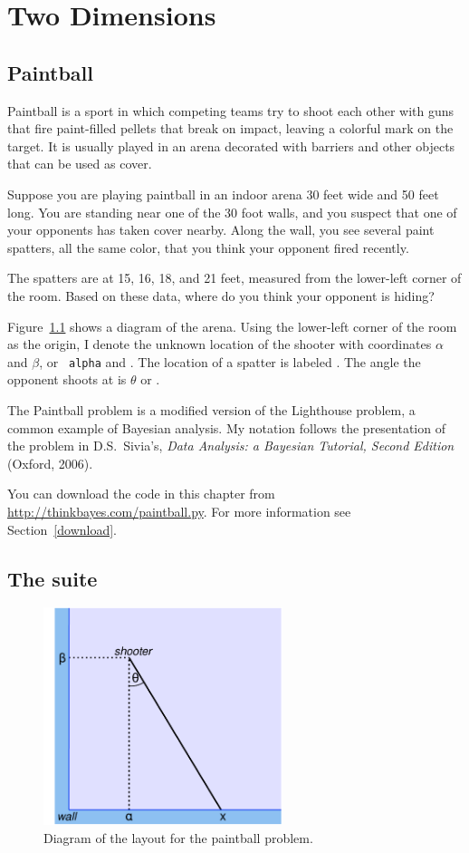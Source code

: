 \documentclass[12pt]{book}
\theoremstyle{exercise}
\begin{document}
\chapter{Two Dimensions}
\label{paintball}

\section{Paintball}

Paintball is a sport in which competing teams try to shoot each other
with guns that fire paint-filled pellets that break on impact, leaving
a colorful mark on the target.  It is usually played in an
arena decorated with barriers and other objects that can be
used as cover.

Suppose you are playing paintball in an indoor arena 30 feet
wide and 50 feet long.  You are standing near one of the 30 foot
walls, and you suspect that one of your opponents has taken cover
nearby.  Along the wall, you see several paint spatters, all the same
color, that you think your opponent fired recently.

The spatters are at 15, 16, 18, and 21 feet, measured from the
lower-left corner of the room.  Based on these data, where do you
think your opponent is hiding?

Figure~\ref{fig.paintball} shows a diagram of the arena.  Using the
lower-left corner of the room as the origin, I denote the unknown
location of the shooter with coordinates $\alpha$ and $\beta$, or {\tt
  alpha} and .  The location of a spatter is labeled
.  The angle the opponent shoots at is $\theta$ or .

The Paintball problem is a modified version
of the Lighthouse problem, a common example of Bayesian analysis.  My
notation follows the presentation of the problem in D.S.~Sivia's, {\it Data
  Analysis: a Bayesian Tutorial, Second Edition} (Oxford, 2006).

You can download the code in this chapter from
\url{http://thinkbayes.com/paintball.py}.  For more information see
Section~\ref{download}.


\section{The suite}

\begin{figure}
\centerline{\includegraphics[height=2.5in]{figs/paintball.pdf}}
\caption{Diagram of the layout for the paintball problem.}
\label{fig.paintball}
\end{figure}
\end{document}
